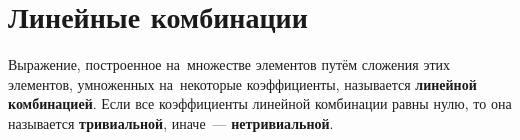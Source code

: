 \section{Линейные комбинации}
Выражение, построенное на~множестве элементов путём сложения этих элементов, умноженных на~некоторые коэффициенты, называется \textbf{линейной комбинацией}.
Если все коэффициенты линейной комбинации равны нулю, то она называется \textbf{тривиальной}, иначе~--- \textbf{нетривиальной}.